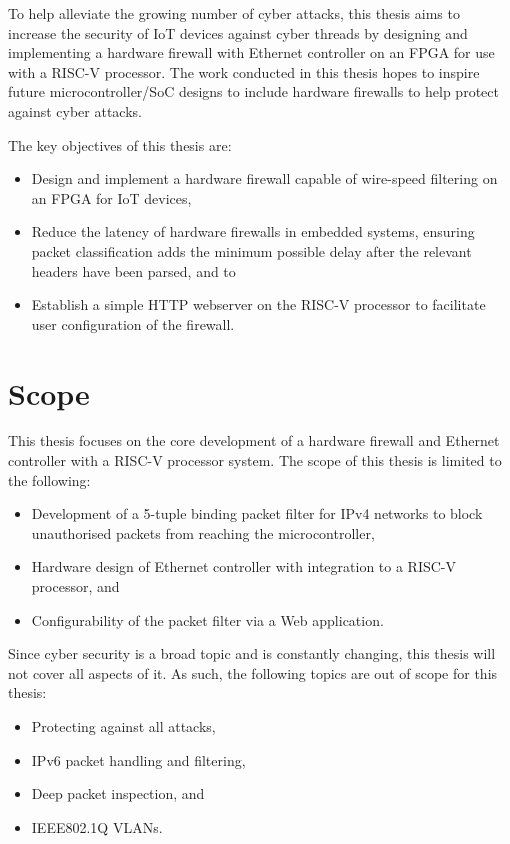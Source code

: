 To help alleviate the growing number of cyber attacks, this thesis aims to increase the security of IoT devices against cyber threads by designing and implementing a hardware firewall with Ethernet controller on an FPGA for use with a RISC-V processor. The work conducted in this thesis hopes to inspire future microcontroller/SoC designs to include hardware firewalls to help protect against cyber attacks. 

The key objectives of this thesis are:

\begin{itemize}
    \item Design and implement a hardware firewall capable of wire-speed filtering on an FPGA for IoT devices,
    \item Reduce the latency of hardware firewalls in embedded systems, ensuring packet classification adds the minimum possible delay after the relevant headers have been parsed, and to
    \item Establish a simple HTTP webserver on the RISC-V processor to facilitate user configuration of the firewall.
\end{itemize}


\section{Scope}

This thesis focuses on the core development of a hardware firewall and Ethernet controller with a RISC-V processor system. The scope of this thesis is limited to the following:

\begin{itemize}
    \item Development of a 5-tuple binding packet filter for IPv4 networks to block unauthorised packets from reaching the microcontroller,
    \item Hardware design of Ethernet controller with integration to a RISC-V processor, and
    \item Configurability of the packet filter via a Web application.
\end{itemize}

\noindent Since cyber security is a broad topic and is constantly changing, this thesis will not cover all aspects of it. As such, the following topics are out of scope for this thesis:

\begin{itemize}
    \item Protecting against all attacks,
    \item IPv6 packet handling and filtering,
    \item Deep packet inspection, and 
    \item IEEE802.1Q VLANs.
\end{itemize}
